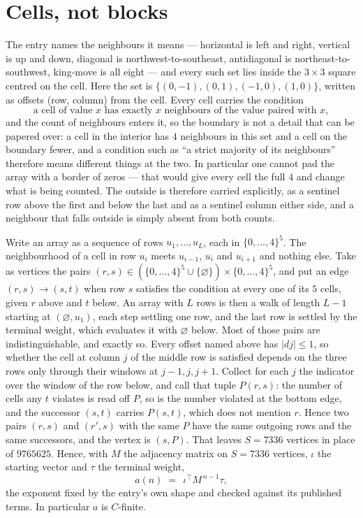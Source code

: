 \documentclass[11pt,a4paper]{article}
\theoremstyle{plain}
\theoremstyle{definition}
\begin{document}
\section{Cells, not blocks}

The entry names the neighbours it means --- horizontal is left and right, vertical is up and
down, diagonal is northwest-to-southeast, antidiagonal is northeast-to-southwest, king-move is
all eight --- and every such set lies inside the $3\times3$ square centred on the cell. Here
the set is $\{(0,-1), (0,1), (-1,0), (1,0)\}$, written as offsets (row, column) from the cell. Every cell carries
the condition
\[
\text{a cell of value }x\text{ has exactly }x\text{ neighbours of the value paired with }x,
\]
and the count of neighbours enters it, so the boundary is not a detail that can be papered
over: a cell in the interior has $4$ neighbours in this set and a cell on the boundary
fewer, and a condition such as ``a strict majority of its neighbours'' therefore means
different things at the two. In particular one cannot pad the array with a border of zeros ---
that would give every cell the full $4$ and change what is being counted. The outside is
therefore carried
explicitly, as a sentinel row above the first and below the last and as a sentinel column
either side, and a neighbour that falls outside is simply absent from both counts.

Write an array as a sequence of rows $u_1,\dots,u_L$, each in
$\{0,\dots,4\}^{5}$. The neighbourhood of a cell in row $u_i$ meets $u_{i-1}$,
$u_i$ and $u_{i+1}$ and nothing else. Take as vertices the pairs
$(r,s)\in(\{0,\dots,4\}^{5}\cup\{\varnothing\})\times\{0,\dots,4\}^{5}$,
and put an edge $(r,s)\to(s,t)$ when row $s$ satisfies the condition at every one of its
$5$ cells, given $r$ above and $t$ below. An array with $L$ rows is then a walk of length
$L-1$ starting at $(\varnothing,u_1)$, each step settling one row, and the last row is
settled by the terminal weight, which evaluates it with $\varnothing$ below. Most of those pairs are indistinguishable, and exactly so. Every offset named above has $|dj|\le 1$, so whether the cell at column $j$ of the middle row is satisfied depends on the three rows only through their windows at $j-1,j,j+1$. Collect for each $j$ the indicator over the window of the row below, and call that tuple $P(r,s)$: the number of cells any $t$ violates is read off $P$, so is the number violated at the bottom edge, and the successor $(s,t)$ carries $P(s,t)$, which does not mention $r$. Hence two pairs $(r,s)$ and $(r',s)$ with the same $P$ have the same outgoing rows and the same successors, and the vertex is $(s,P)$. That leaves $S=7336$ vertices in place of $9765625$. Hence,
with $M$ the adjacency matrix on $S=7336$ vertices, $\iota$ the starting vector and $\tau$ the
terminal weight,
\[
a(n)\;=\;\,\iota^{\!\top}M^{\,n-1}\tau ,
\]
the exponent fixed by the entry's own shape and checked against its published terms. In
particular $a$ is $C$-finite.
\end{document}
